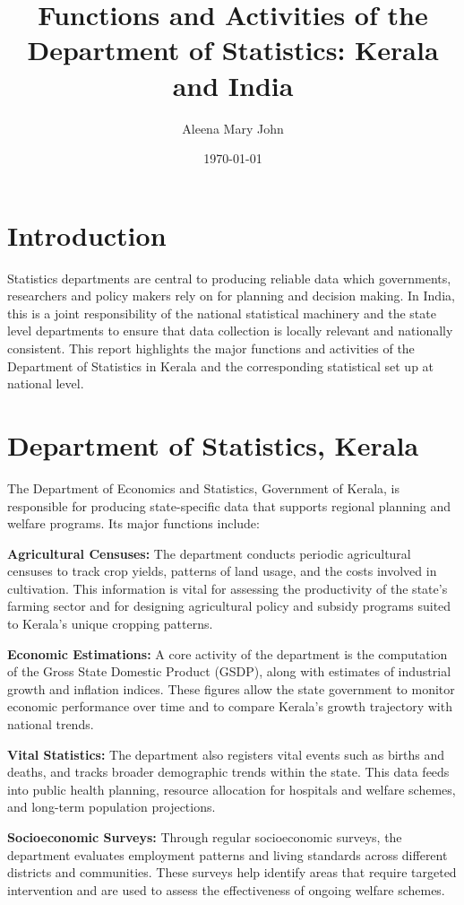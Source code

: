 \documentclass[12pt]{article}
\title{Functions and Activities of the Department of Statistics: Kerala and India}
\author{Aleena Mary John}
\date{\today}
\begin{document}
\maketitle

\section*{Introduction}
Statistics departments are central to producing reliable data which governments, researchers and policy makers rely on for planning and decision making. In India, this is a joint responsibility of the national statistical machinery and the state level departments to ensure that data collection is locally relevant and nationally consistent. This report highlights the major functions and activities of the Department of Statistics in Kerala and the corresponding statistical set up at national level.

\section*{Department of Statistics, Kerala}
The Department of Economics and Statistics, Government of Kerala, is responsible for producing state-specific data that supports regional planning and welfare programs. Its major functions include:

\textbf{Agricultural Censuses:} The department conducts periodic agricultural censuses to track crop yields, patterns of land usage, and the costs involved in cultivation. This information is vital for assessing the productivity of the state's farming sector and for designing agricultural policy and subsidy programs suited to Kerala's unique cropping patterns.

\textbf{Economic Estimations:} A core activity of the department is the computation of the Gross State Domestic Product (GSDP), along with estimates of industrial growth and inflation indices. These figures allow the state government to monitor economic performance over time and to compare Kerala's growth trajectory with national trends.

\textbf{Vital Statistics:} The department also registers vital events such as births and deaths, and tracks broader demographic trends within the state. This data feeds into public health planning, resource allocation for hospitals and welfare schemes, and long-term population projections.

\textbf{Socioeconomic Surveys:} Through regular socioeconomic surveys, the department evaluates employment patterns and living standards across different districts and communities. These surveys help identify areas that require targeted intervention and are used to assess the effectiveness of ongoing welfare schemes.
\end{document}

